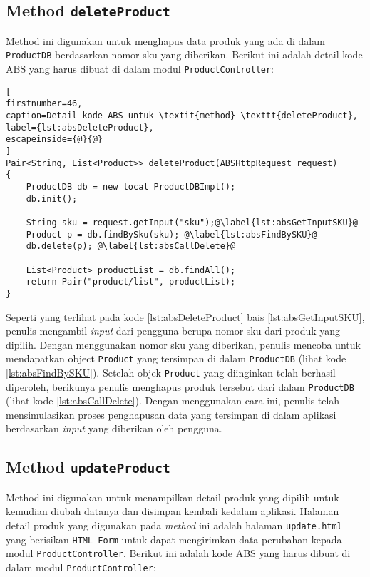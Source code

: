 \subsection{Method \texttt{deleteProduct}}
Method ini digunakan untuk menghapus data produk yang ada di dalam \texttt{ProductDB} berdasarkan nomor sku yang diberikan. Berikut ini adalah detail kode ABS yang harus dibuat di dalam modul \texttt{ProductController}:

\begin{lstlisting}[
firstnumber=46,
caption=Detail kode ABS untuk \textit{method} \texttt{deleteProduct},
label={lst:absDeleteProduct},
escapeinside={@}{@}
]
Pair<String, List<Product>> deleteProduct(ABSHttpRequest request)
{
	ProductDB db = new local ProductDBImpl();
	db.init();
	
	String sku = request.getInput("sku");@\label{lst:absGetInputSKU}@
	Product p = db.findBySku(sku); @\label{lst:absFindBySKU}@
	db.delete(p); @\label{lst:absCallDelete}@
	
	List<Product> productList = db.findAll();
	return Pair("product/list", productList);
}
\end{lstlisting}

Seperti yang terlihat pada kode \ref{lst:absDeleteProduct} bais \ref{lst:absGetInputSKU}, penulis mengambil \textit{input} dari pengguna berupa nomor sku dari produk yang dipilih. Dengan menggunakan nomor sku yang diberikan, penulis mencoba untuk mendapatkan object \texttt{Product} yang tersimpan di dalam \texttt{ProductDB} (lihat kode \ref{lst:absFindBySKU}). Setelah objek \texttt{Product} yang diinginkan telah berhasil diperoleh, berikunya penulis menghapus produk tersebut dari dalam \texttt{ProductDB} (lihat kode \ref{lst:absCallDelete}). Dengan menggunakan cara ini, penulis telah mensimulasikan proses penghapusan data yang tersimpan di dalam aplikasi berdasarkan \textit{input} yang diberikan oleh pengguna.
 
\subsection{Method \texttt{updateProduct}}

Method ini digunakan untuk menampilkan detail produk yang dipilih untuk kemudian diubah datanya dan disimpan kembali kedalam aplikasi. Halaman detail produk yang digunakan pada \textit{method} ini adalah halaman \texttt{update.html} yang berisikan \texttt{HTML Form} untuk dapat mengirimkan data perubahan kepada modul \texttt{ProductController}. Berikut ini adalah kode ABS yang harus dibuat di dalam modul \texttt{ProductController}:

